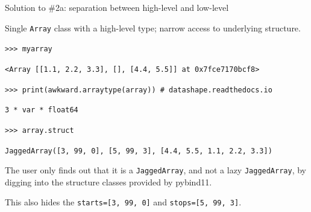 \documentclass[aspectratio=169]{beamer}
\begin{document}
\begin{frame}[fragile]{Solution to \#2a: separation between high-level and low-level}
\large
\vspace{0.5 cm}

Single {\tt Array} class with a high-level type; narrow access to underlying structure.

\small
\vspace{0.2 cm}
\texttt{>>> myarray}

\vspace{0.1 cm}
{\tt <Array [[1.1, 2.2, 3.3], [], [4.4, 5.5]] at 0x7fce7170bcf8>}

\vspace{0.2 cm}
\texttt{>>> print(awkward.arraytype(array))   # datashape.readthedocs.io}

\vspace{0.1 cm}
{\tt 3 * var * float64}

\vspace{0.2 cm}
\texttt{>>> array.struct}

\vspace{0.1 cm}
{\tt JaggedArray([3, 99, 0], [5, 99, 3], [4.4, 5.5, 1.1, 2.2, 3.3])}

\large
\vspace{0.3 cm}
The user only finds out that it is a {\tt JaggedArray}, and not a lazy {\tt JaggedArray}, by digging into the structure classes provided by pybind11.

\vspace{0.1 cm}
This also hides the \texttt{starts=[3, 99, 0]} and \texttt{stops=[5, 99, 3]}.
\end{frame}
\end{document}
